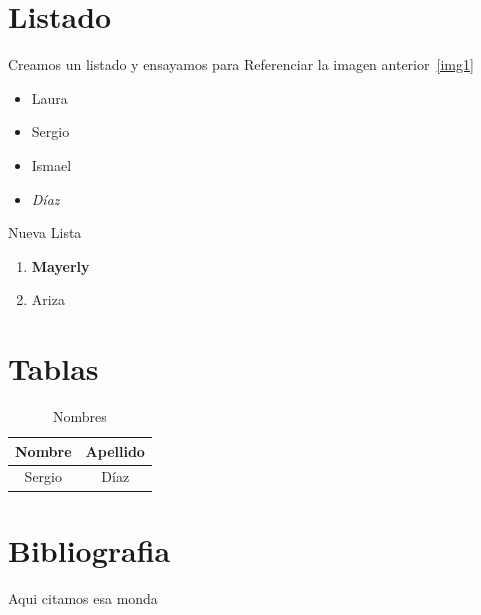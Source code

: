\documentclass{article}
\begin{document}
    \section{Listado}
    Creamos un listado y ensayamos para Referenciar la imagen anterior~\ref{img1}
    \begin{itemize}[noitemsep]
        \item Laura
        \item Sergio
        \item Ismael
        \item \textit{Díaz}
    \end{itemize}

    Nueva Lista
    \begin{enumerate}
        \item \textbf{Mayerly}
        \item Ariza
    \end{enumerate}

    \section{Tablas}
    \begin{table}[H]
        \centering
        \begin{tabular}{|c|c|}
            \hline
            Nombre & Apellido\\
            \hline
            Sergio & Díaz\\
            \hline
        \end{tabular}
        \caption{Nombres}
        \label{Tabla1}
    \end{table}

    \section{Bibliografia}
    Aqui citamos esa monda~\cite{mcfar}


    
    
\end{document}
